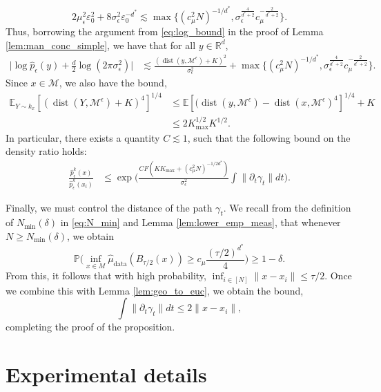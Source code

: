 \documentclass[10pt]{article}
\theoremstyle{plain}
\theoremstyle{definition}
\theoremstyle{remark}
\newcommand{\M}{{\mathcal{M}}}
\newcommand{\R}{\mathbb{R}}
\newcommand{\E}{\mathbb{E}}
\newcommand{\prob}{\mathbb{P}}
\newcommand{\hmud}{\hat{\mu}_{\operatorname{data}}}
\newcommand{\dist}{\operatorname{dist}}
\begin{document}
\begin{equation*}
    2\mu_\epsilon^2\varepsilon_0^2 + 8 \sigma_\epsilon^2 \varepsilon_0^{-d^*} \lesssim \max\{(c_\mu^2 N)^{-1/d^*}, \sigma_\epsilon^{\frac{4}{d^*+2}} c_\mu^{-\frac{2}{d^*+2}}\}.
\end{equation*}
Thus, borrowing the argument from \eqref{eq:log_bound} in the proof of Lemma \ref{lem:man_conc_simple}, we have that for all \(y \in \R^d\),
\begin{align*}
    \Big | \log \hat{p}_\epsilon(y) + \frac{d}{2}\log(2\pi\sigma_\epsilon^2) \Big | &\lesssim \frac{(\dist(y, \M^\epsilon) + K)^2}{\sigma_\epsilon^2} + \max\{(c_\mu^2 N)^{-1/d^*}, \sigma_\epsilon^{\frac{4}{d^*+2}} c_\mu^{-\frac{2}{d^*+2}}\}.
\end{align*}
Since \(x \in \M\), we also have the bound,
\begin{align*}
    \E_{Y \sim k_x}[(\dist(Y, \M^\epsilon) + K)^4]^{1/4} &\leq \E[(\dist(y, \M^\epsilon) - \dist(x, \M^\epsilon)^4]^{1/4} + K\\
    &\leq 2 K_{\max}^{1/2} K^{1/2}.
\end{align*}
In particular, there exists a quantity \(C \lesssim 1\), such that the following bound on the density ratio holds:
\begin{align*}
    \frac{\hat{p}^{k}_\epsilon(x)}{\hat{p}^{k}_\epsilon(x_i)} &\leq \exp \bigg ( \frac{C F (K K_{\max} + (c_\mu^2 N)^{-1/2d^*})}{\sigma_\epsilon^2} \int \|\partial_t \gamma_t\| dt \bigg ).
\end{align*}

Finally, we must control the distance of the path \(\gamma_t\). We recall from the definition of \(N_{\min}(\delta)\) in \eqref{eq:N_min} and Lemma \ref{lem:lower_emp_meas}, that whenever \(N \geq N_{\min}(\delta)\), we obtain
\begin{equation*}
    \prob \bigg ( \inf_{x \in M} \hmud(B_{\tau/2}(x)) \geq c_\mu \frac{(\tau/2)^{d^*}}{4} \bigg ) \geq 1 - \delta.
\end{equation*}
From this, it follows that with high probability, \(\inf_{i \in [N]} \|x - x_i\| \leq \tau/2\). Once we combine this with Lemma \ref{lem:geo_to_euc}, we obtain the bound,
\begin{equation*}
    \int \|\partial_t \gamma_t\| dt \leq 2 \|x - x_i\|,
\end{equation*}
completing the proof of the proposition.

\section{Experimental details} \label{app:experiment_details}
\end{document}
